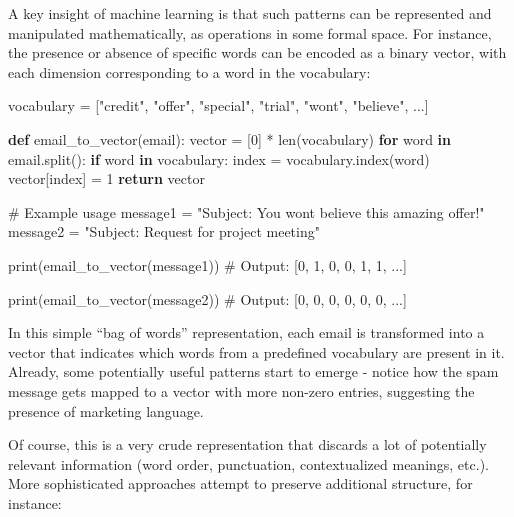 \documentclass[
  9pt,
  letterpaper,
  abstract,
  titlepage]{scrbook}
\newenvironment{Shaded}{\begin{snugshade}}{\end{snugshade}}
\newcommand{\BuiltInTok}[1]{\textcolor[rgb]{0.00,0.23,0.31}{#1}}
\newcommand{\CommentTok}[1]{\textcolor[rgb]{0.37,0.37,0.37}{#1}}
\newcommand{\ControlFlowTok}[1]{\textcolor[rgb]{0.00,0.23,0.31}{\textbf{#1}}}
\newcommand{\DecValTok}[1]{\textcolor[rgb]{0.68,0.00,0.00}{#1}}
\newcommand{\KeywordTok}[1]{\textcolor[rgb]{0.00,0.23,0.31}{\textbf{#1}}}
\newcommand{\NormalTok}[1]{\textcolor[rgb]{0.00,0.23,0.31}{#1}}
\newcommand{\OperatorTok}[1]{\textcolor[rgb]{0.37,0.37,0.37}{#1}}
\newcommand{\StringTok}[1]{\textcolor[rgb]{0.13,0.47,0.30}{#1}}
\begin{document}
A key insight of machine learning is that such patterns can be
represented and manipulated mathematically, as operations in some formal
space. For instance, the presence or absence of specific words can be
encoded as a binary vector, with each dimension corresponding to a word
in the vocabulary:

\begin{Shaded}
\begin{Highlighting}[]
\NormalTok{vocabulary }\OperatorTok{=}\NormalTok{ [}\StringTok{"credit"}\NormalTok{, }\StringTok{"offer"}\NormalTok{, }\StringTok{"special"}\NormalTok{, }\StringTok{"trial"}\NormalTok{, }\StringTok{"won\textquotesingle{}t"}\NormalTok{, }\StringTok{"believe"}\NormalTok{, ...]}

\KeywordTok{def}\NormalTok{ email\_to\_vector(email):}
\NormalTok{    vector }\OperatorTok{=}\NormalTok{ [}\DecValTok{0}\NormalTok{] }\OperatorTok{*} \BuiltInTok{len}\NormalTok{(vocabulary)}
    \ControlFlowTok{for}\NormalTok{ word }\KeywordTok{in}\NormalTok{ email.split():}
        \ControlFlowTok{if}\NormalTok{ word }\KeywordTok{in}\NormalTok{ vocabulary:}
\NormalTok{            index }\OperatorTok{=}\NormalTok{ vocabulary.index(word)}
\NormalTok{            vector[index] }\OperatorTok{=} \DecValTok{1}
    \ControlFlowTok{return}\NormalTok{ vector}
    
\CommentTok{\# Example usage}
\NormalTok{message1 }\OperatorTok{=} \StringTok{"Subject: You won\textquotesingle{}t believe this amazing offer!"}
\NormalTok{message2 }\OperatorTok{=} \StringTok{"Subject: Request for project meeting"}

\BuiltInTok{print}\NormalTok{(email\_to\_vector(message1))}
\CommentTok{\# Output: [0, 1, 0, 0, 1, 1, ...]}

\BuiltInTok{print}\NormalTok{(email\_to\_vector(message2))  }
\CommentTok{\# Output: [0, 0, 0, 0, 0, 0, ...]}
\end{Highlighting}
\end{Shaded}

In this simple ``bag of words'' representation, each email is
transformed into a vector that indicates which words from a predefined
vocabulary are present in it. Already, some potentially useful patterns
start to emerge - notice how the spam message gets mapped to a vector
with more non-zero entries, suggesting the presence of marketing
language.

Of course, this is a very crude representation that discards a lot of
potentially relevant information (word order, punctuation,
contextualized meanings, etc.). More sophisticated approaches attempt to
preserve additional structure, for instance:
\end{document}
